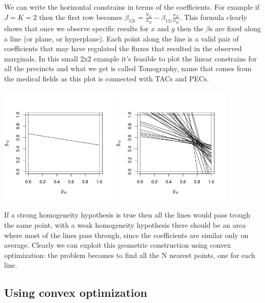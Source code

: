 \documentclass{article}
\begin{document}
We can write the horizontal constrains in terms of the coefficients. For example if $J=K=2$ then the first row becomes $\beta_{12i}=\frac{y_{1i}}{x_{2i}}-\beta_{11i}\frac{x_{1i}}{x_{2i}}$. This formula clearly shows that once we observe specific results for $x$ and $y$ then the $\beta$s are fixed along a line (or plane, or hyperplane). Each point along the line is a valid pair of coefficients that may have regulated the fluxes that resulted in the observed marginals. In this small 2x2 example it's feasible to plot the linear constrains for all the precincts and what we get is called Tomography, name that comes from the medical fields as this plot is connected with TACs and PECs.

\includegraphics[width=0.425\textwidth]{tomography01.png}
\includegraphics[width=0.425\textwidth]{tomography02.png}

If a strong homogeneity hypothesis is true then all the lines would pass trough the same point, with a weak homogeneity hypothesis there should be an area where most of the lines pass through, since the coefficients are similar only on average. Clearly we can exploit this geometric construction using convex optimization: the problem becomes to find all the N nearest points, one for each line.

\subsection*{Using convex optimization}
\end{document}
